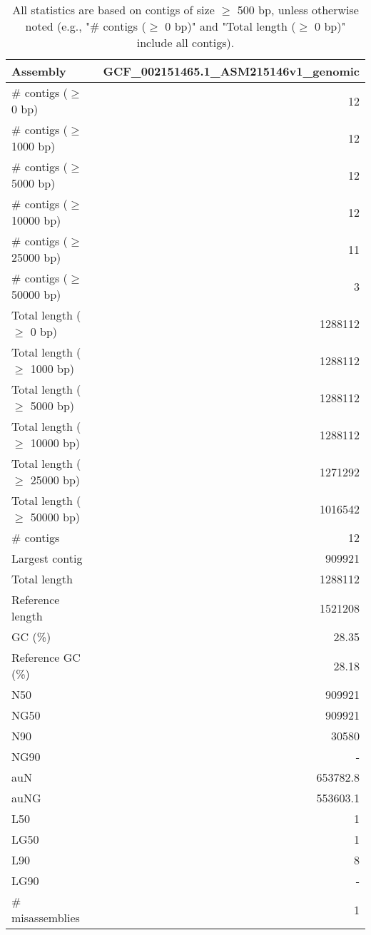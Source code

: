 \documentclass[12pt,a4paper]{article}
\begin{document}
\begin{table}[ht]
\begin{center}
\caption{All statistics are based on contigs of size $\geq$ 500 bp, unless otherwise noted (e.g., "\# contigs ($\geq$ 0 bp)" and "Total length ($\geq$ 0 bp)" include all contigs).}
\begin{tabular}{|l*{1}{|r}|}
\hline
Assembly & GCF\_002151465.1\_ASM215146v1\_genomic \\ \hline
\# contigs ($\geq$ 0 bp) & 12 \\ \hline
\# contigs ($\geq$ 1000 bp) & 12 \\ \hline
\# contigs ($\geq$ 5000 bp) & 12 \\ \hline
\# contigs ($\geq$ 10000 bp) & 12 \\ \hline
\# contigs ($\geq$ 25000 bp) & 11 \\ \hline
\# contigs ($\geq$ 50000 bp) & 3 \\ \hline
Total length ($\geq$ 0 bp) & 1288112 \\ \hline
Total length ($\geq$ 1000 bp) & 1288112 \\ \hline
Total length ($\geq$ 5000 bp) & 1288112 \\ \hline
Total length ($\geq$ 10000 bp) & 1288112 \\ \hline
Total length ($\geq$ 25000 bp) & 1271292 \\ \hline
Total length ($\geq$ 50000 bp) & 1016542 \\ \hline
\# contigs & 12 \\ \hline
Largest contig & 909921 \\ \hline
Total length & 1288112 \\ \hline
Reference length & 1521208 \\ \hline
GC (\%) & 28.35 \\ \hline
Reference GC (\%) & 28.18 \\ \hline
N50 & 909921 \\ \hline
NG50 & 909921 \\ \hline
N90 & 30580 \\ \hline
NG90 & - \\ \hline
auN & 653782.8 \\ \hline
auNG & 553603.1 \\ \hline
L50 & 1 \\ \hline
LG50 & 1 \\ \hline
L90 & 8 \\ \hline
LG90 & - \\ \hline
\# misassemblies & 1 \\ \hline

\end{tabular}
\end{center}
\end{table}
\end{document}
